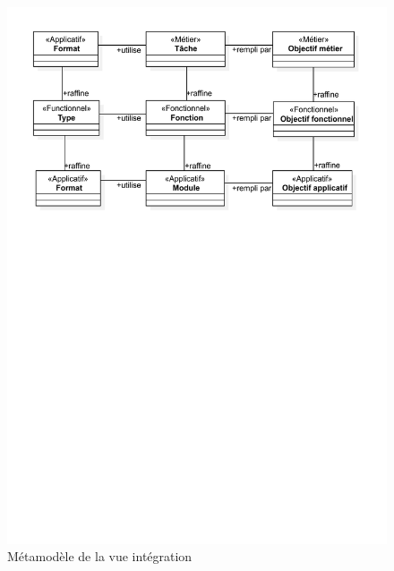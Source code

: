 \begin{figure}[!ht] \begin{center}
\includegraphics[trim= 0cm 18cm 0cm 0cm, width=1\textwidth]{figures/4_demarche/metamodele_vue_integration.pdf}
\end{center}
\caption{Métamodèle de la vue intégration}
\label{fig:metamodele_vue_integration}
\end{figure}







